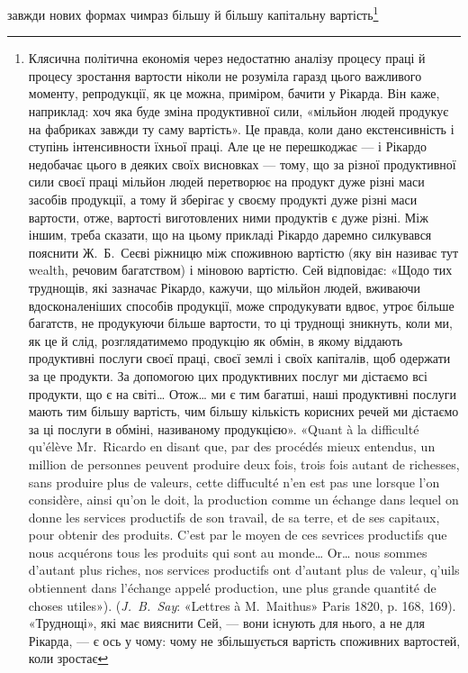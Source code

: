 завжди нових формах чимраз більшу й більшу капітальну вартість\footnote{
Клясична політична економія через недостатню аналізу процесу
праці й процесу зростання вартости ніколи не розуміла гаразд цього
важливого моменту, репродукції, як це можна, приміром, бачити у Рікарда.
Він каже, наприклад: хоч яка буде зміна продуктивної сили,
«мільйон людей продукує на фабриках завжди ту саму вартість». Це
правда, коли дано екстенсивність і ступінь інтенсивности їхньої праці.
Але це не перешкоджає — і Рікардо недобачає цього в деяких своїх висновках
— тому, що за різної продуктивної сили своєї праці мільйон людей
перетворює на продукт дуже різні маси засобів продукції, а тому й зберігає
у своєму продукті дуже різні маси вартости, отже, вартості виготовлених
ними продуктів є дуже різні. Між іншим, треба сказати, що на цьому
прикладі Рікардо даремно силкувався пояснити Ж.~Б.~Сеєві ріжницю
між споживною вартістю (яку він називає тут wealth, речовим багатством)
і міновою вартістю. Сей відповідає: «Щодо тих труднощів, які
зазначає Рікардо, кажучи, що мільйон людей, вживаючи вдосконаленіших
способів продукції, може спродукувати вдвоє, утроє більше багатств,
не продукуючи більше вартости, то ці труднощі зникнуть, коли ми, як
це й слід, розглядатимемо продукцію як обмін, в якому віддають продуктивні
послуги своєї праці, своєї землі і своїх капіталів, щоб одержати
за це продукти. За допомогою цих продуктивних послуг ми дістаємо всі
продукти, що є на світі\dots{} Отож\dots{} ми є тим багатші, наші продуктивні
послуги мають тим більшу вартість, чим більшу кількість корисних
речей ми дістаємо за ці послуги в обміні, називаному продукцією».
«Quant à la difficulté qu’élève Mr.~Ricardo en disant que, par des procédés
mieux entendus, un million de personnes peuvent produire deux fois,
trois fois autant de richesses, sans produire plus de valeurs, cette diffuculté
n’en est pas une lorsque l’on considère, ainsi qu’on le doit, la production
comme un échange dans lequel on donne les services productifs de son travail,
de sa terre, et de ses capitaux, pour obtenir des produits. C’est par
le moyen de ces sevrices productifs que nous acquérons tous les produits
qui sont au monde\dots{} Or\dots{} nous sommes d’autant plus riches, nos services
productifs ont d’autant plus de valeur, q’uils obtiennent dans l’échange
appelé production, une plus grande quantité de choses utiles»). (\emph{J.~B.~Say}:
«Lettres à M.~Maithus» Paris 1820, p. 168, 169). «Труднощі», які має
вияснити Сей, — вони існують для нього, а не для Рікарда, — є ось у
чому: чому не збільшується вартість споживних вартостей, коли зростає
}
